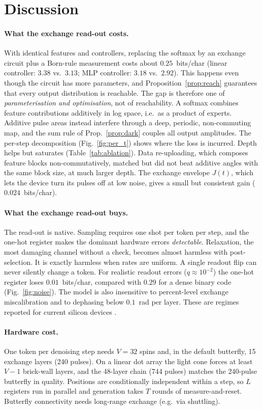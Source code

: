 \section{Discussion}
\paragraph{What the exchange read-out costs.} With identical features and controllers, replacing the
softmax by an exchange circuit plus a Born-rule measurement costs about $0.25$~bits/char
(linear controller: $3.38$ vs.\ $3.13$; MLP controller: $3.18$ vs.\ $2.92$). This happens even though
the circuit has more parameters, and Proposition~\ref{prop:reach} guarantees that every output
distribution is reachable. The gap is therefore one of \emph{parameterisation and optimisation}, not of
reachability. A softmax combines feature contributions additively in log space, i.e.\ as a product of
experts. Additive pulse areas instead interfere through a deep, periodic, non-commuting map, and the
sum rule of Prop.~\ref{prop:dark} couples all output amplitudes. The per-step decomposition
(Fig.~\ref{fig:per_t}) shows where the loss is incurred. Depth helps but saturates
(Table~\ref{tab:ablation}). Data re-uploading, which composes feature blocks non-commutatively, matched but did not beat additive
angles with the same block size, at much larger depth. The exchange envelope $J(t)$, which lets the device
turn its pulses off at low noise, gives a small but consistent gain ($0.024$~bits/char).

\paragraph{What the exchange read-out buys.} The read-out is native. Sampling requires one shot per token
per step, and the one-hot register makes the dominant hardware errors \emph{detectable}.
Relaxation, the most damaging channel without a check, becomes almost harmless with post-selection. It
is exactly harmless when rates are uniform. A single readout flip can never silently change a token.
For realistic readout errors ($q\approx10^{-2}$) the one-hot register loses $0.01$~bits/char, compared
with $0.29$ for a dense binary code (Fig.~\ref{fig:noise}). The model is also insensitive to
percent-level exchange miscalibration and to dephasing below $0.1$~rad per layer. These are regimes
reported for current silicon devices \citep{burkard2023semiconductor}.

\paragraph{Hardware cost.} One token per denoising step needs $V=32$ spins and, in the default
butterfly, 15 exchange layers (240 pulses). On a linear dot array the light cone forces at least $V-1$
brick-wall layers, and the 48-layer chain (744 pulses) matches the 240-pulse butterfly in quality. Positions
are conditionally independent within a step, so $L$ registers run in parallel and generation takes $T$
rounds of measure-and-reset. Butterfly connectivity needs long-range exchange (e.g.\ via shuttling).

